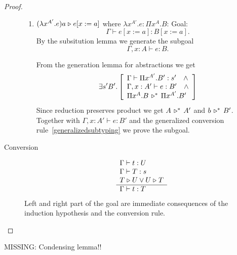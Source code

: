 \begin{theorem}
\begin{proof}
\begin{description}
\begin{enumerate}
      \item $(\lambda x^{A'} .e) a \mathrel{\triangleright} e[x:=a]$ where
        $\lambda x^{A'} .e: \Pi x^A. B$:
        Goal: $$\Gamma \vdash e[x:=a] : B[x:=a].$$
        By the subsitution lemma we
        generate the subgoal $$\Gamma,x:A \vdash e : B.$$

        From the generation lemma for abstractions we get
        $$
        \exists s' B'.
        \left[
          \begin{array}{l}
          \Gamma \vdash\Pi x^{A'}.B' : s' \quad\land
          \\
          \Gamma,x:A' \vdash e:B' \quad\land
          \\
          \Pi x^A. B \,\triangleright^*\, \Pi x^{A'}.B'
          \end{array}
          \right]
        $$
        Since reduction preserves product we get $A \,\triangleright^*\, A'$ and
        $b \,\triangleright^*\, B'$. Together with $\Gamma,x:A' \vdash e:B'$ and the
        generalized conversion rule~\ref{generalizedsubtyping} we prove the
        subgoal.
      \end{enumerate}


    \item[Conversion]
      $$
      \begin{array}{l}  \Gamma \vdash t : U
        \\
        \Gamma \vdash T : s
        \\
        T \mathrel{\triangleright} U \lor U \mathrel{\triangleright} T
       \\ \hline \Gamma \vdash t: T\end{array}
      $$
      Left and right part of the goal are immediate consequences of the
      induction hypothesis and the conversion rule.
    \end{description}
  \end{proof}
\end{theorem}


MISSING: Condensing lemma!!

